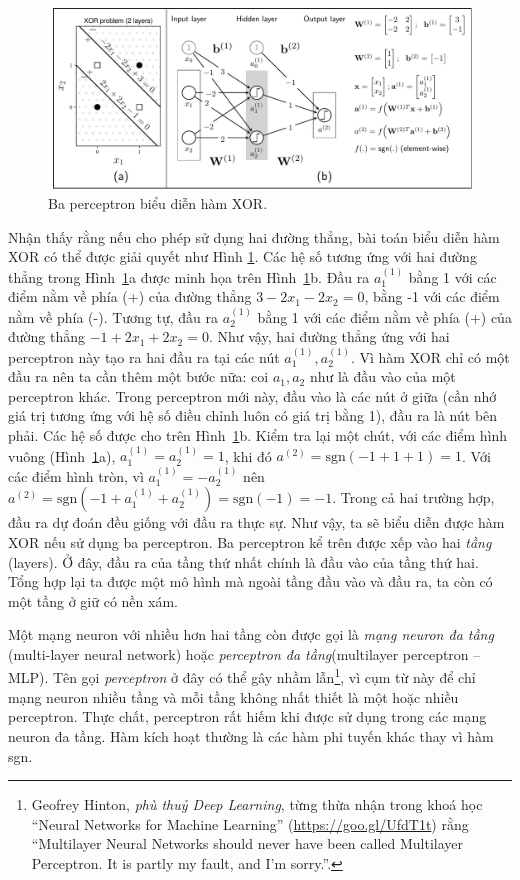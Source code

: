 \begin{figure}[t]
\centering
\includegraphics[width = \textwidth]{Chapters/05_NeuralNetworks/14_mlp/latex/xor_nn.pdf}
\caption[]{Ba perceptron biểu diễn hàm XOR.}
\label{fig:14_2}
\end{figure}

Nhận thấy rằng nếu cho phép sử dụng hai đường thẳng, bài toán biểu diễn hàm XOR
có thể được giải quyết như Hình \ref{fig:14_2}. Các hệ số tương ứng với hai
đường thẳng trong Hình~\ref{fig:14_2}a được minh họa trên Hình~\ref{fig:14_2}b. Đầu ra $a_1^{(1)}$ bằng 1
với các điểm nằm về phía (+) của đường thẳng $3 -2x_1 -2x_2 = 0$, bằng -1 với
các điểm nằm về phía (-). Tương tự, đầu ra $a_2^{(1)}$ bằng 1 với các điểm nằm về phía
(+) của đường thẳng $-1 +2x_1 + 2x_2 = 0$. Như vậy, hai đường thẳng ứng với hai
perceptron này tạo ra hai đầu ra tại các nút $a_1^{(1)}, a_2^{(1)}$. Vì hàm XOR
chỉ có một đầu ra nên ta cần thêm một bước nữa: coi $a_1, a_2$ như là đầu
vào của một perceptron khác. Trong perceptron mới này, đầu vào là các nút ở giữa
(cần nhớ giá trị tương ứng với hệ số điều chỉnh luôn có giá trị bằng 1), đầu ra là nút bên phải. Các hệ số
được cho trên Hình~\ref{fig:14_2}b. Kiểm tra lại một chút, với các điểm hình
vuông (Hình~\ref{fig:14_2}a), $a^{(1)}_1 = a^{(1)}_2 = 1$, khi đó $a^{(2)}
= \text{sgn}(-1 +1 + 1) = 1$. Với các điểm hình tròn, vì $a^{(1)}_1 =
-a^{(1)}_2$ nên $a^{(2)} = \text{sgn}(-1 + a^{(1)}_1 + a^{(1)}_2) =
\text{sgn}(-1) = -1$. Trong cả hai trường hợp, đầu ra dự đoán đều giống với đầu
ra thực sự. Như vậy, ta sẽ biểu diễn được hàm XOR nếu sử dụng ba perceptron. Ba perceptron kể trên được
xếp vào hai \textit{tầng} ({layers}). Ở đây, đầu ra của tầng thứ nhất chính là
đầu vào của tầng thứ hai. Tổng hợp lại ta được một mô hình mà ngoài tầng đầu
vào và đầu ra, ta còn có một tầng ở giữ có nền xám.

Một mạng neuron với nhiều hơn hai tầng còn được gọi là \textit{mạng neuron đa tầng} (multi-layer neural network) hoặc \textit{perceptron đa tầng}(multilayer perceptron -- MLP). Tên gọi
\textit{perceptron} ở đây có thể gây nhầm lẫn\footnote{Geofrey Hinton,
\textit{phù thuỷ Deep Learning}, từng thừa nhận trong khoá học ``Neural Networks
for Machine Learning'' (\url{https://goo.gl/UfdT1t}) rằng ``Multilayer Neural
Networks should never have been called Multilayer Perceptron. It is partly my
fault, and I'm sorry.''.}, vì cụm từ này để chỉ mạng neuron nhiều tầng
và mỗi tầng không nhất thiết là một hoặc
nhiều perceptron. Thực chất, perceptron rất hiếm khi được sử dụng trong các mạng neuron đa tầng. Hàm kích hoạt thường là các hàm phi tuyến khác thay vì hàm
sgn.

